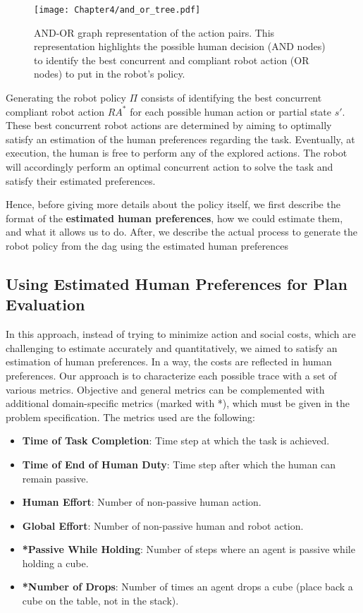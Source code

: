 \begin{figure}[h]
    \texttt{[image: Chapter4/and\_or\_tree.pdf]}
    \caption{AND-OR graph representation of the action pairs. 
    This representation highlights the possible human decision (AND nodes) to identify the best concurrent and compliant robot action (OR nodes) to put in the robot's policy. 
    }
    \label{fig:and_or}
\end{figure}


Generating the robot policy $\Pi$ consists of identifying the best concurrent compliant robot action $RA^*$ for each possible human action or partial state $s'$. These best concurrent robot actions are determined by aiming to optimally satisfy an estimation of the human preferences regarding the task. Eventually, at execution, the human is free to perform any of the explored actions. The robot will accordingly perform an optimal concurrent action to solve the task and satisfy their estimated preferences.

Hence, before giving more details about the policy itself, we first describe the format of the \textbf{estimated human preferences}, how we could estimate them, and what it allows us to do. After, we describe the actual process to generate the robot policy from the \acrshort{dag} using the estimated human preferences


    \subsection{Using Estimated Human Preferences for Plan Evaluation}

In this approach, instead of trying to minimize action and social costs, which are challenging to estimate accurately and quantitatively, we aimed to satisfy an estimation of human preferences. In a way, the costs are reflected in human preferences. Our approach is to characterize each possible trace with a set of various metrics. Objective and general metrics can be complemented with additional domain-specific metrics (marked with *), which must be given in the problem specification. The metrics used are the following:

\begin{itemize}
    \item \textbf{Time of Task Completion}: Time step at which the task is achieved.
    \item \textbf{Time of End of Human Duty}: Time step after which the human can remain passive.
    \item \textbf{Human Effort}: Number of non-passive human action.
    \item \textbf{Global Effort}: Number of non-passive human and robot action.
    \item \textbf{*Passive While Holding}: Number of steps where an agent is passive while holding a cube.
    \item \textbf{*Number of Drops}: Number of times an agent drops a cube (place back a cube on the table, not in the stack).
\end{itemize}

